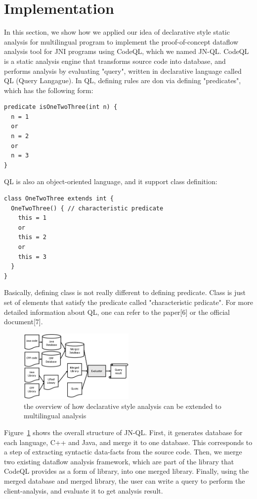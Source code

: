 \section{Implementation}
In this section, we show how we applied our idea of declarative style static
analysis for multilingual program to implement the proof-of-concept dataflow
analysis tool for JNI programs using CodeQL, which we named JN-QL. CodeQL is a
static analysis engine that transforms source code into database, and performs
analysis by evaluating "query", written in declarative language called QL
(Query Langague). In QL, defining rules are don via defining "predicates",
which has the following form:
\begin{lstlisting}[style=codeql,xleftmargin=2.5em]
predicate isOneTwoThree(int n) {
  n = 1
  or
  n = 2
  or
  n = 3
}
\end{lstlisting}

QL is also an object-oriented language, and it support class definition:
\begin{lstlisting}[style=codeql,xleftmargin=2.5em]
class OneTwoThree extends int {
  OneTwoThree() { // characteristic predicate
    this = 1
    or
    this = 2
    or
    this = 3
  }
}
\end{lstlisting}

Basically, defining class is not really different to defining predicate.  Class
is just set of elements that satisfy the predicate called "characteristic
prdicate". For more detailed information about QL, one can refer to the
paper[6] or the official document[7].

\begin{figure}[t]
  \centering
  \vspace{2mm}
  \includegraphics[width=0.5\textwidth]{img/Fig1}
  \vspace*{-1.5em}
  \caption{the overview of how declarative style analysis can be
  extended to multilingual analysis}
  \label{fig:Fig1}
\vspace*{-.5em}
\end{figure}

Figure~\ref{fig:Fig1} shows the overall structure of JN-QL. First, it generates database
for each language, C++ and Java, and merge it to one database. This corresponds
to a step of extracting syntactic data-facts from the source code. Then, we
merge two existing dataflow analysis framework, which are part of the library
that CodeQL provides as a form of library, into one merged library. Finally,
using the merged database and merged library, the user can write a query to
perform the client-analysis, and evaluate it to get analysis result.

